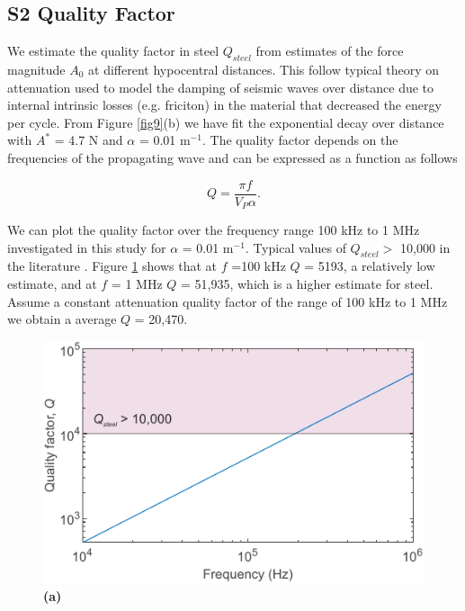 \documentclass[preprint,3p, 11pt,authoryear]{elsarticle}
\begin{document}
\clearpage
\subsection*{S2 Quality Factor}
We estimate the quality factor in steel $Q_{steel}$ from estimates of the force magnitude $A_{0}$ at different hypocentral distances. This follow typical theory on attenuation used to model the damping of seismic waves over distance due to internal intrinsic losses (e.g. friciton) in the material that decreased the energy per cycle\citep[e.g.][]{Barton2007}. From Figure \ref{fig9}(b) we have fit the exponential decay over distance with $A^{*}$ = 4.7 N and $\alpha$ = 0.01 m$^{-1}$. The quality factor depends on the frequencies of the propagating wave and can be expressed as a function as follows

\begin{equation}
    \label{eqS2}
Q = \frac{\pi f}{V_{P}\alpha}.
\end{equation}

\noindent We can plot the quality factor over the frequency range 100 kHz to 1 MHz investigated in this study for $\alpha$ = 0.01 m$^{-1}$. Typical values of $Q_{steel} > $ 10,000 in the literature \citep{WaitingRUI}. Figure \ref{figS1} shows that at $f$ =100 kHz $Q$ = 5193, a relatively low estimate, and at $f$ = 1 MHz $Q$ = 51,935, which is a higher estimate for steel. Assume a constant attenuation quality factor of the range of 100 kHz to 1 MHz we obtain a average $Q$ = 20,470. 


\begin{figure}[ht]
     	\centering
\includegraphics[scale= 1]{FIGS1.pdf} 
\caption{\textbf{(a)}  }
	\label{figS1} 
\end{figure}
\end{document}
